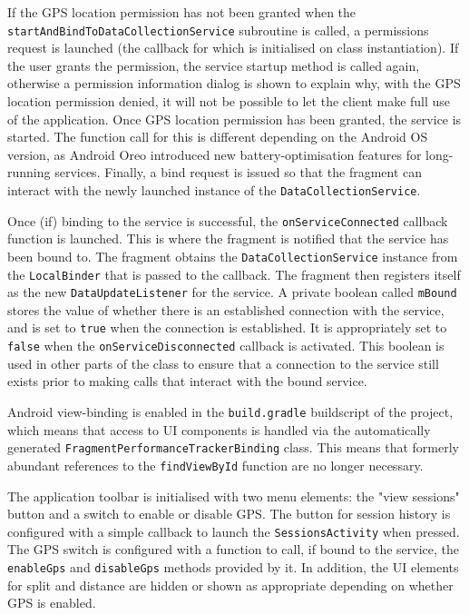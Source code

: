 \documentclass[11pt,twoside,a4paper]{report}
\begin{document}
If the GPS location permission has not been granted when the \texttt{startAndBindToDataCollectionService} subroutine is called, a permissions request is launched (the callback for which is initialised on class instantiation). If the user grants the permission, the service startup method is called again, otherwise a permission information dialog is shown to explain why, with the GPS location permission denied, it will not be possible to let the client make full use of the application. Once GPS location permission has been granted, the service is started. The function call for this is different depending on the Android OS version, as Android Oreo introduced new battery-optimisation features for long-running services. Finally, a bind request is issued so that the fragment can interact with the newly launched instance of the \texttt{DataCollectionService}.

Once (if) binding to the service is successful, the \texttt{onServiceConnected} callback function is launched. This is where the fragment is notified that the service has been bound to. The fragment obtains the \texttt{DataCollectionService} instance from the \texttt{LocalBinder} that is passed to the callback. The fragment then registers itself as the new \texttt{DataUpdateListener} for the service. A private boolean called \texttt{mBound} stores the value of whether there is an established connection with the service, and is set to \texttt{true} when the connection is established. It is appropriately set to \texttt{false} when the \texttt{onServiceDisconnected} callback is activated. This boolean is used in other parts of the class to ensure that a connection to the service still exists prior to making calls that interact with the bound service.

Android view-binding is enabled in the \texttt{build.gradle} buildscript of the project, which means that access to UI components is handled via the automatically generated \texttt{FragmentPerformanceTrackerBinding} class. This means that formerly abundant references to the \texttt{findViewById} function are no longer necessary.

The application toolbar is initialised with two menu elements: the "view sessions" button and a switch to enable or disable GPS. The button for session history is configured with a simple callback to launch the \texttt{SessionsActivity} when pressed. The GPS switch is configured with a function to call, if bound to the service, the \texttt{enableGps} and \texttt{disableGps} methods provided by it. In addition, the UI elements for split and distance are hidden or shown as appropriate depending on whether GPS is enabled.
\end{document}
